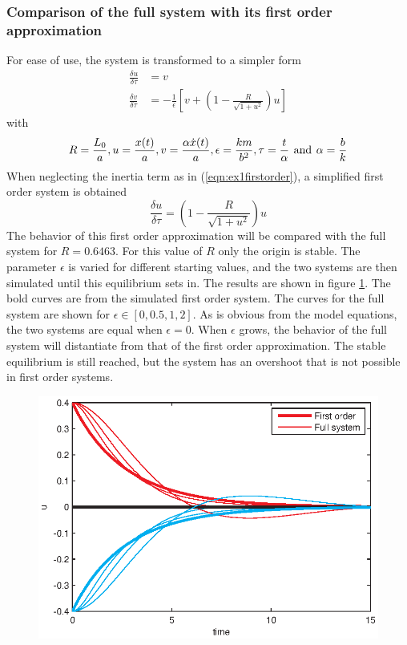 \subsubsection{Comparison of the full system with its first order approximation}
For ease of use, the system is transformed to a simpler form
\begin{align}
\frac{\delta u}{\delta \tau} &= v \\
\frac{\delta v}{\delta \tau} &= -\frac{1}{\epsilon} [v+(1-\frac{R}{\sqrt{1+u^2}})u]
\end{align}
with 
\begin{equation}\label{eqn:ex1transfers}
R=\frac{L_0}{a}, u=\frac{x(t)}{a},v=\frac{\alpha \dot{x}(t)}{a},\epsilon=\frac{km}{b^2},\tau=\frac{t}{\alpha}\mbox{\hspace{4pt}and\hspace{4pt}} \alpha=\frac{b}{k}
\end{equation} 
When neglecting the inertia term as in (\ref{eqn:ex1firstorder}), a simplified first order system is obtained
\begin{equation}
\frac{\delta u}{\delta \tau}=(1-\frac{R}{\sqrt{1+u^2}})u
\end{equation}
The behavior of this first order approximation will be compared with the full system for $R=0.6463$. For this value of $R$ only the origin is stable. The parameter $\epsilon$ is varied for different starting values, and the two systems are then simulated until this equilibrium sets in. The results are shown in figure \ref{fig:ex1epsilon}. The bold curves are from the simulated first order system. The curves for the full system are shown for $\epsilon \in [0,0.5,1,2]$. As is obvious from the model equations, the two systems are equal when $\epsilon=0$. When $\epsilon$ grows, the behavior of the full system will distantiate from that of the first order approximation. The stable equilibrium is still reached, but the system has an overshoot that is not possible in first order systems.
\begin{figure}[htp]
\centering
\includegraphics{img/ex1/epsilon.eps}
\caption{}
\label{fig:ex1epsilon}
\end{figure}

